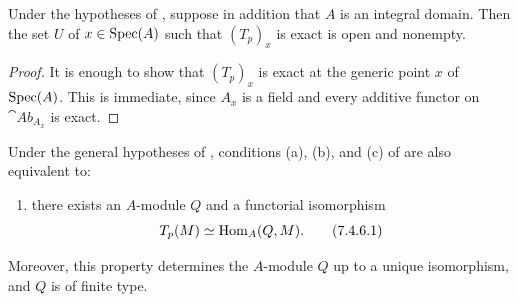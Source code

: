 \begin{corollary}[7.4.5]
\label{III.7.4.5}
Under the hypotheses of , suppose in addition
that $A$ is an integral domain.  Then the set $U$ of
$x\in\operatorname{Spec}(A)$ such that $(T_p)_x$ is exact is open and
nonempty.
\end{corollary}

\begin{proof}
It is enough to show that $(T_p)_x$ is exact at the generic
point $x$ of $\operatorname{Spec}(A)$.  This is immediate, since $A_x$ is a
field and every additive functor on $\cat{Ab}_{A_x}$ is exact.
\end{proof}

\begin{proposition}[7.4.6]
\label{III.7.4.6}
Under the general hypotheses of , conditions
(a), (b), and (c) of  are also equivalent to:
\begin{enumerate}
  \item[(d)] there exists an $A$-module $Q$ and a functorial
    isomorphism
    \[
      T_p(M)\simeq\operatorname{Hom}_A(Q,M).
      \tag{7.4.6.1}\label{III.7.4.6.1.eq}
    \]
\end{enumerate}
Moreover, this property determines the $A$-module $Q$ up to a
unique isomorphism, and $Q$ is of finite type.
\end{proposition}

